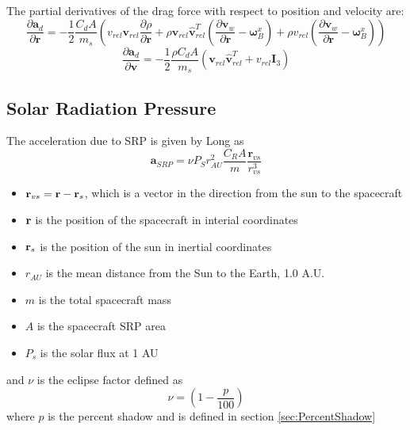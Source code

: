 The partial derivatives of the drag force with respect to position and velocity are:
%
\begin{equation}
   \frac{\partial \mathbf{a}_d }{\partial \mathbf{r}} = -\frac{1}{2}\frac{C_d A}{m_s}\left( v_{rel}\mathbf{v}_{rel}\frac{\partial \rho}{\partial \mathbf{r}} + \rho \mathbf{v}_{rel}\hat{\mathbf{v}}_{rel}^T \left(\frac{\partial \mathbf{v}_{w}}{\partial \mathbf{r}}  - \boldsymbol{\omega}_B^{x}\right) +
   \rho v_{rel} \left( \frac{ \partial \mathbf{v}_w}{\partial \mathbf{r}} - \boldsymbol{\omega}_B^{x} \right)\right)
\end{equation}
%
\begin{equation}
    \frac{\partial \mathbf{a}_d }{\partial \mathbf{v}} = -\frac{1}{2}\frac{\rho C_d A}{m_s}\left(  \mathbf{v}_{rel}\hat{\mathbf{v}}_{rel}^T + v_{rel}\mathbf{I}_3\right)
\end{equation}
%
%


\subsection{Solar Radiation Pressure}

The acceleration due to SRP is given by Long\cite{GTDS} as
%
\begin{equation}
     \mathbf{a}_{SRP} = \nu P_{S}\displaystyle r_{AU}^2 \frac{   C_R A    }{m}\frac{\mathbf{r}_{vs}}{r_{vs}^3}
\end{equation}
%
\begin{itemize}
   \item  $\mathbf{r}_{vs} = \mathbf{r} - \mathbf{r}_s$, which is a vector in the direction from the sun to the spacecraft
   \item  $\mathbf{r}$ is the position of the spacecraft in interial coordinates
   \item  $\mathbf{r}_s$ is the position of the sun in inertial coordinates
   \item  $r_{AU}$ is the mean distance from the Sun to the Earth, 1.0 A.U.
   \item  $m$ is the total spacecraft mass
   \item  $A$ is the spacecraft SRP area
   \item  $P_s$ is the solar flux at 1 AU
\end{itemize}
%
and $\nu$ is the eclipse factor defined as
%
\begin{equation}
 \nu = \left( 1 - \frac{p}{100} \right)
\end{equation}
%
where $p$ is the percent shadow and is defined in section \ref{sec:PercentShadow}

